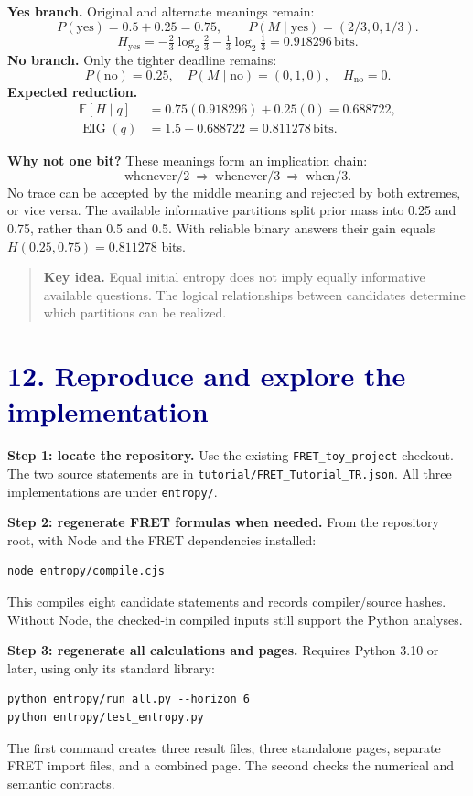 \documentclass[11pt,a4paper]{article}
\newcommand{\lesson}[2]{\section*{\textcolor{navy}{#1. #2}}}
\newcommand{\key}[1]{\begin{quote}\color{teal}\textbf{Key idea.} #1\end{quote}}
\newcommand{\bits}{\,\mathrm{bits}}
\begin{document}
\textbf{Yes branch.} Original and alternate meanings remain:
\[
P(\mathrm{yes})=0.5+0.25=0.75,\qquad
P(M\mid\mathrm{yes})=(2/3,0,1/3).
\]
\[
H_{\mathrm{yes}}=-\tfrac23\log_2\tfrac23-\tfrac13\log_2\tfrac13
=0.918296\bits.
\]
\textbf{No branch.} Only the tighter deadline remains:
\[
P(\mathrm{no})=0.25,\quad P(M\mid\mathrm{no})=(0,1,0),\quad H_{\mathrm{no}}=0.
\]
\textbf{Expected reduction.}
\begin{align*}
\mathbb{E}[H\mid q]&=0.75(0.918296)+0.25(0)=0.688722,\\
\operatorname{EIG}(q)&=1.5-0.688722=\boxed{0.811278\bits}.
\end{align*}

\textbf{Why not one bit?} These meanings form an implication chain:
\[
\text{whenever/2}\ \Longrightarrow\ \text{whenever/3}\ \Longrightarrow\ \text{when/3}.
\]
No trace can be accepted by the middle meaning and rejected by both extremes, or vice versa. The available informative partitions split prior mass into 0.25 and 0.75, rather than 0.5 and 0.5. With reliable binary answers their gain equals \(H(0.25,0.75)=0.811278\) bits.

\key{Equal initial entropy does not imply equally informative available questions. The logical relationships between candidates determine which partitions can be realized.}
\newpage

\lesson{12}{Reproduce and explore the implementation}
\textbf{Step 1: locate the repository.} Use the existing \texttt{FRET\_toy\_project} checkout. The two source statements are in \texttt{tutorial/FRET\_Tutorial\_TR.json}. All three implementations are under \texttt{entropy/}.

\textbf{Step 2: regenerate FRET formulas when needed.} From the repository root, with Node and the FRET dependencies installed:
\begin{verbatim}
node entropy/compile.cjs
\end{verbatim}
This compiles eight candidate statements and records compiler/source hashes. Without Node, the checked-in compiled inputs still support the Python analyses.

\textbf{Step 3: regenerate all calculations and pages.} Requires Python 3.10 or later, using only its standard library:
\begin{verbatim}
python entropy/run_all.py --horizon 6
python entropy/test_entropy.py
\end{verbatim}
The first command creates three result files, three standalone pages, separate FRET import files, and a combined page. The second checks the numerical and semantic contracts.
\end{document}
